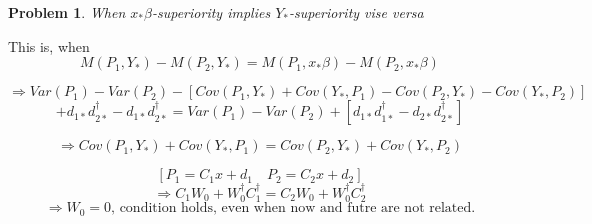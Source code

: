 \documentclass{article}
\newtheorem{problem}[theorem]{Problem}
\begin{document}
\setcounter{part}{5} \setcounter{page}{27}

\begin{problem}
When $x_{\ast }\beta $-superiority implies $Y_{\ast }$-superiority vise versa
\end{problem}

This is, when%
\begin{equation*}
M\left( P_{1},Y_{\ast }\right) -M\left( P_{2},Y_{\ast }\right) =M\left(
P_{1},x_{\ast }\beta \right) -M\left( P_{2},x_{\ast }\beta \right)
\end{equation*}

\begin{equation*}
\Rightarrow Var\left( P_{1}\right) -Var\left( P_{2}\right) -\left[ Cov\left(
P_{1},Y_{\ast }\right) +Cov\left( Y_{\ast },P_{1}\right) -Cov\left(
P_{2},Y_{\ast }\right) -Cov\left( Y_{\ast },P_{2}\right) \right]
\end{equation*}%
\begin{equation*}
+d_{1\ast }d_{2\ast }^{\dagger }-d_{1\ast }d_{2\ast }^{\dagger }=Var\left(
P_{1}\right) -Var\left( P_{2}\right) +\left[ d_{1\ast }d_{1\ast }^{\dagger
}-d_{2\ast }d_{2\ast }^{\dagger }\right]
\end{equation*}

\begin{equation*}
\Rightarrow Cov\left( P_{1},Y_{\ast }\right) +Cov\left( Y_{\ast
},P_{1}\right) =Cov\left( P_{2},Y_{\ast }\right) +Cov\left( Y_{\ast
},P_{2}\right)
\end{equation*}

\begin{equation*}
\left[ P_{1}=C_{1}x+d_{1}\quad P_{2}=C_{2}x+d_{2}\right]
\end{equation*}%
\begin{equation*}
\Rightarrow C_{1}W_{0}+W_{0}^{\dagger }C_{1}^{\dagger
}=C_{2}W_{0}+W_{0}^{\dagger }C_{2}^{\dagger }
\end{equation*}%
\begin{equation*}
\Rightarrow W_{0}=0\text{, condition holds, even when now and futre are not
related.}
\end{equation*}

\bigskip
\end{document}
